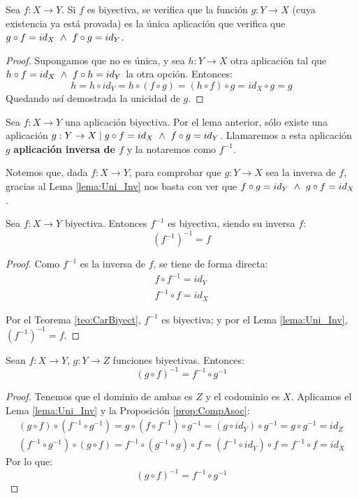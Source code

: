 \begin{lema}[Unicidad]\label{lema:Uni_Inv}
    Sea $f:X\to Y$. Si $f$ es biyectiva, se verifica que la función $g:Y \rightarrow X$ (cuya existencia ya está provada) es la única aplicación que verifica que $g \circ f = id_X \ \land \  f \circ g = id_Y$.
\end{lema}
\begin{proof}
    Supongamos que no es única, y sea $h:Y \rightarrow X$ otra aplicación tal que $h \circ f = id_X \ \land \  f \circ h = id_Y$ la otra opción. Entonces:
    $$h = h \circ id_Y = h \circ (f \circ g) = (h \circ f) \circ g = id_X \circ g = g$$
    Quedando así demostrada la unicidad de $g$.
\end{proof}

\begin{definicion}[Inversa]
    Sea $f:X \rightarrow Y$ una aplicación biyectiva. Por el lema anterior, sólo existe una aplicación $g:Y \rightarrow X \mid g \circ f = id_X \ \land \  f \circ g = id_Y$. Llamaremos a esta aplicación $g$ \textbf{aplicación
        inversa de $f$} y la notaremos como $f^{-1}$.
\end{definicion}


Notemos que, dada $f:X \rightarrow Y$, para comprobar que $g:Y \rightarrow X$ sea la inversa de $f$, gracias al Lema \ref{lema:Uni_Inv} nos basta con ver que $f \circ g = id_Y \ \land \  g \circ f = id_X$.

\begin{lema}
    Sea $f:X \rightarrow Y$ biyectiva. Entonces $f^{-1}$ es biyectiva, siendo su inversa $f$:
    $$(f^{-1})^{-1} = f$$
\end{lema}
\begin{proof}
    Como $f^{-1}$ es la inversa de $f$, se tiene de forma directa:
    \begin{gather*}
        f \circ f^{-1} = id_Y \\
        f^{-1} \circ f = id_X
    \end{gather*}
    
    Por el Teorema \ref{teo:CarBiyect}, $f^{-1}$ es biyectiva; y por el Lema \ref{lema:Uni_Inv}, $(f^{-1})^{-1} = f$.
\end{proof}

\begin{lema}
    Sean $f:X \rightarrow Y$, $g:Y \rightarrow Z$ funciones biyectivas. Entonces:
    $$(g \circ f)^{-1} = f^{-1} \circ g^{-1}$$
\end{lema}
\begin{proof}
Tenemos que el dominio de ambas es $Z$ y el codominio es $X$. Aplicamos el Lema \ref{lema:Uni_Inv} y la Proposición \ref{prop:CompAsoc}:
\begin{gather*}
    (g \circ f) \circ (f^{-1} \circ g^{-1}) = g \circ (f \circ f^{-1}) \circ g^{-1} = (g \circ id_Y) \circ g^{-1} = g \circ g^{-1} = id_Z \\
    (f^{-1} \circ g^{-1}) \circ (g \circ f) = f^{-1} \circ (g^{-1} \circ g) \circ f = (f^{-1} \circ id_Y) \circ f = f^{-1} \circ f = id_X
\end{gather*}
Por lo que: $$(g \circ f)^{-1} = f^{-1} \circ g^{-1}$$
\end{proof}

